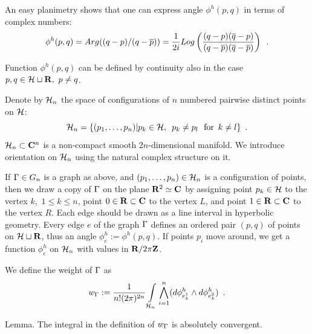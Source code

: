             \vskip 1cm
            \centerline{
}
\vskip 11mm

           
           An easy planimetry shows that
        one can express angle $\phi^{h}(p,q)$ in terms of 
            complex numbers:
             $$\phi^{h}(p,q)=Arg((q-p)/(q-{\overline p}))={1\over 2 i}
              Log\left({(q-p)({\overline q}-p)\over
              (q-{\overline p})({\overline q} -
              {\overline p})}\right)\,\,\,.$$
              
          Function $\phi^{h}(p,q)$ can be defined by continuity also in 
          the case
           $p,q\in{\cal H}\sqcup {\bf R},\,\,p\ne q$.
           
           Denote by ${\cal H}_n$ the  space of configurations
            of $n$ numbered 
           pairwise distinct
           points on ${\cal H}$:
           $${\cal H}_n=\{(p_1,\dots,p_n)|p_k\in {\cal H},\,\,\, 
           p_k\ne p_l\,\,\,\,{\rm for}
           \,\,\,k\ne l\}\,\,\,.$$
           ${\cal H}_n\subset {\bf C}^{n}$ is a non-compact smooth
           $2n$-dimensional manifold.
            We introduce  orientation on ${\cal H}_n$ using the natural complex
             structure on it.
            
            If ${\Gamma}\in G_n$ is a graph as above, and $(p_1,\dots,p_n)\in 
            {\cal H}_n$
             is a configuration of points, then we draw a copy of ${\Gamma}$ 
             on the plane 
          ${\bf R}^2\simeq {\bf C}$  by assigning point
           $p_k\in {\cal H}$ to the vertex  
          $k,\,\,1\le k\le n$, point $0\in {\bf R}\subset {\bf C}$ to the vertex 
          $L$, 
          and point $1\in {\bf R}\subset {\bf C}$ to the vertex $R$. Each edge 
          should 
          be drawn
           as a line interval in hyperbolic geometry.
            Every  edge $e$ 
            of the graph ${\Gamma}$ defines an ordered pair $(p,q)$ 
             of points on ${\cal H}\sqcup {\bf R}$, thus an angle 
             $\phi^{h}_e:=\phi^{h}(p,q)$.
             If points $p_i$ move around, we get a function
              $\phi^{h}_e$ on ${\cal H}_n$ with values in ${\bf R}/2 \pi {\bf Z}$.
              
              We define the weight  of ${\Gamma}$ as 
              $$w_{\Gamma}:={1\over  n! 
              (2\pi)^{2n}}\int\limits_{{\cal H}_n}\bigwedge_{i=1}^n 
                  (d\phi^{h}_{e_k^1}\wedge d\phi^{h}_{e_k^2})
                  \,\,\,. $$
              
              
              
     \proclaim Lemma. The integral in the definition  of $w_{\Gamma}$ is 
     absolutely convergent.
     \par        
            

